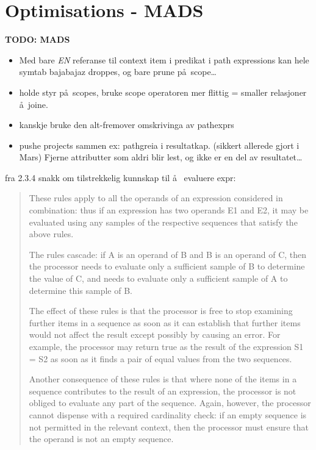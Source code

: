 \section{Optimisations - {MADS}}
\label{sect:disc:optimisations}
\textbf{\LARGE TODO: {MADS}}
\begin{itemize}
  \item Med bare \emph{EN} referanse til context item i predikat i path expressions kan hele symtab bajabajaz
  droppes, og bare prune p\aa~scope\ldots
  \item holde styr p\aa~scopes, bruke scope operatoren mer flittig = smaller relasjoner \aa~joine.
  \item kanskje bruke den alt-fremover omskrivinga av pathexprs
  \item pushe projects sammen ex: pathgreia i resultatkap. (sikkert allerede gjort i Mars) Fjerne attributter som
  aldri blir lest, og ikke er en del av resultatet\ldots
\end{itemize}

fra 2.3.4 snakk om tilstrekkelig kunnskap til \aa~ evaluere expr:
\begin{quote}
These rules apply to all the operands of an expression considered in combination: thus if an expression has two
operands E1 and E2, it may be evaluated using any samples of the respective sequences that satisfy the above rules.

The rules cascade: if A is an operand of B and B is an operand of C, then the processor needs to evaluate only a
sufficient sample of B to determine the value of C, and needs to evaluate only a sufficient sample of A to
determine this sample of B.

The effect of these rules is that the processor is free to stop examining further items in a sequence as soon as
it can establish that further items would not affect the result except possibly by causing an error. For example,
the processor may return true as the result of the expression S1 = S2 as soon as it finds a pair of equal values
from the two sequences.

Another consequence of these rules is that where none of the items in a sequence contributes to the result of an
expression, the processor is not obliged to evaluate any part of the sequence. Again, however, the processor
cannot dispense with a required cardinality check: if an empty sequence is not permitted in the relevant context,
then the processor must ensure that the operand is not an empty sequence.
\end{quote}